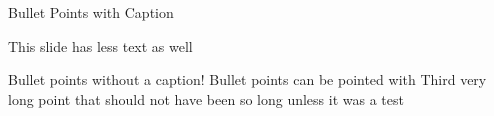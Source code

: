 \begin{frame}{Bullet Points with Caption}
 \begin{fullpageitemize}
  \item \begin{center}\end{center}
  \item \begin{center}This slide has less text as well\end{center}
 \end{fullpageitemize}
\end{frame}

\begin{frame}{}
 \vfill
 \begin{fullpageitemize}
  \itemR Bullet points without a caption!
  \itemR Bullet points can be pointed with \rtarrow
  \itemR Third very long point that should not have been so long unless it was a test
 \end{fullpageitemize}
\end{frame}

